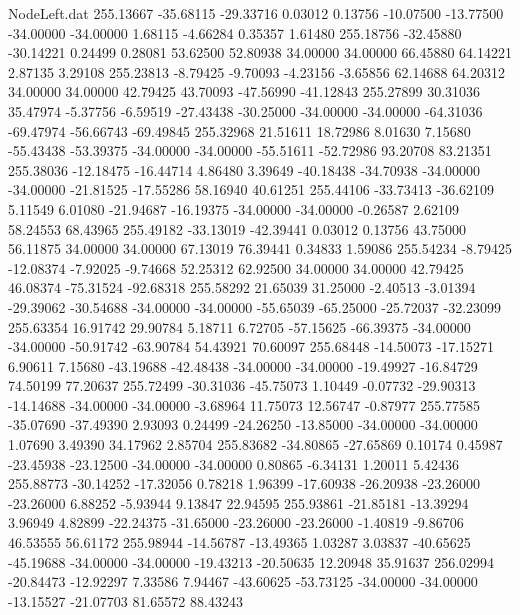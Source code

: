 \begin{filecontents}{NodeLeft.dat}
 255.13667  -35.68115  -29.33716     0.03012    0.13756  -10.07500  -13.77500  -34.00000  -34.00000    1.68115   -4.66284    0.35357    1.61480
 255.18756  -32.45880  -30.14221     0.24499    0.28081   53.62500   52.80938   34.00000   34.00000   66.45880   64.14221    2.87135    3.29108
 255.23813   -8.79425   -9.70093    -4.23156   -3.65856   62.14688   64.20312   34.00000   34.00000   42.79425   43.70093  -47.56990  -41.12843
 255.27899   30.31036   35.47974    -5.37756   -6.59519  -27.43438  -30.25000  -34.00000  -34.00000  -64.31036  -69.47974  -56.66743  -69.49845
 255.32968   21.51611   18.72986     8.01630    7.15680  -55.43438  -53.39375  -34.00000  -34.00000  -55.51611  -52.72986   93.20708   83.21351
 255.38036  -12.18475  -16.44714     4.86480    3.39649  -40.18438  -34.70938  -34.00000  -34.00000  -21.81525  -17.55286   58.16940   40.61251
 255.44106  -33.73413  -36.62109     5.11549    6.01080  -21.94687  -16.19375  -34.00000  -34.00000   -0.26587    2.62109   58.24553   68.43965
 255.49182  -33.13019  -42.39441     0.03012    0.13756   43.75000   56.11875   34.00000   34.00000   67.13019   76.39441    0.34833    1.59086
 255.54234   -8.79425  -12.08374    -7.92025   -9.74668   52.25312   62.92500   34.00000   34.00000   42.79425   46.08374  -75.31524  -92.68318
 255.58292   21.65039   31.25000    -2.40513   -3.01394  -29.39062  -30.54688  -34.00000  -34.00000  -55.65039  -65.25000  -25.72037  -32.23099
 255.63354   16.91742   29.90784     5.18711    6.72705  -57.15625  -66.39375  -34.00000  -34.00000  -50.91742  -63.90784   54.43921   70.60097
 255.68448  -14.50073  -17.15271     6.90611    7.15680  -43.19688  -42.48438  -34.00000  -34.00000  -19.49927  -16.84729   74.50199   77.20637
 255.72499  -30.31036  -45.75073     1.10449   -0.07732  -29.90313  -14.14688  -34.00000  -34.00000   -3.68964   11.75073   12.56747   -0.87977
 255.77585  -35.07690  -37.49390     2.93093    0.24499  -24.26250  -13.85000  -34.00000  -34.00000    1.07690    3.49390   34.17962    2.85704
 255.83682  -34.80865  -27.65869     0.10174    0.45987  -23.45938  -23.12500  -34.00000  -34.00000    0.80865   -6.34131    1.20011    5.42436
 255.88773  -30.14252  -17.32056     0.78218    1.96399  -17.60938  -26.20938  -23.26000  -23.26000    6.88252   -5.93944    9.13847   22.94595
 255.93861  -21.85181  -13.39294     3.96949    4.82899  -22.24375  -31.65000  -23.26000  -23.26000   -1.40819   -9.86706   46.53555   56.61172
 255.98944  -14.56787  -13.49365     1.03287    3.03837  -40.65625  -45.19688  -34.00000  -34.00000  -19.43213  -20.50635   12.20948   35.91637
 256.02994  -20.84473  -12.92297     7.33586    7.94467  -43.60625  -53.73125  -34.00000  -34.00000  -13.15527  -21.07703   81.65572   88.43243

\end{filecontents}
